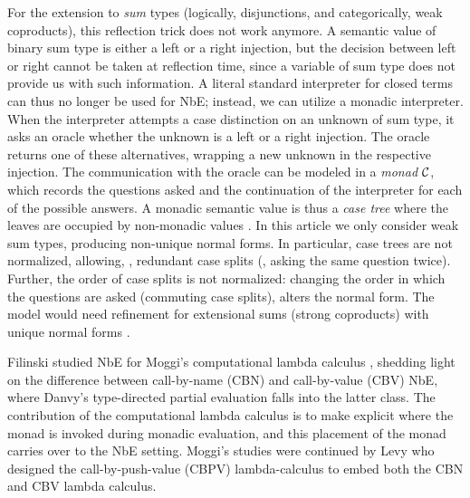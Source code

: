 \documentclass[sigplan,screen,fleqn]{acmart}
\begin{document}
For the extension to \emph{sum} types (logically, disjunctions, and categorically,
weak coproducts), this reflection trick does not work anymore.  A
semantic value of binary sum type is either a left or a right
injection, but the decision between left or right cannot be taken at
reflection time, since a variable of sum type does not provide us with
such information.  A literal standard interpreter for closed terms can
thus no longer be used for NbE;  instead, we can utilize a monadic
interpreter.  When the interpreter attempts a case distinction on an
unknown of sum type, it asks an oracle whether the unknown is a left
or a right injection.  The oracle returns one of these alternatives,
wrapping a new unknown in the respective injection.  The communication with the
oracle can be modeled in a \emph{monad} $\mathcal{C}$,
which records the questions asked and the continuation of the
interpreter for each of the possible answers.
A monadic semantic value is thus a \emph{case tree} where the leaves
are occupied by non-monadic values \cite{altenkirchUustalu:flops04}.
In this article we only consider weak sum types, producing non-unique
normal forms.  In particular, case trees are not normalized, allowing,
\eg, redundant case splits (\ie, asking the same question twice).
Further, the order of case splits is not normalized: changing the
order in which the questions are asked (commuting case splits),
alters the normal form.
The model would need refinement for extensional sums (strong
coproducts) with unique normal forms
\cite{altenkirchDybjerHofmannScott:lics01,altenkirchUustalu:flops04,balatDiCosmoFiore:popl04,barral:PhD,scherer:popl17}.

Filinski \cite{filinski:tlca01} studied NbE for Moggi's computational lambda
calculus \cite{moggi:infcomp91}, shedding light on the difference
between call-by-name (CBN) and call-by-value (CBV) NbE, where Danvy's
type-directed partial evaluation \cite{danvy:popl96} falls into the
latter class.  The contribution of the computational lambda calculus
is to make explicit where the monad is invoked during monadic
evaluation, and this placement of the monad carries over to the NbE
setting.  Moggi's studies were continued by Levy \cite{levy:hosc06}
who designed the call-by-push-value (CBPV) lambda-calculus to embed
both the CBN and CBV lambda calculus.
\end{document}

